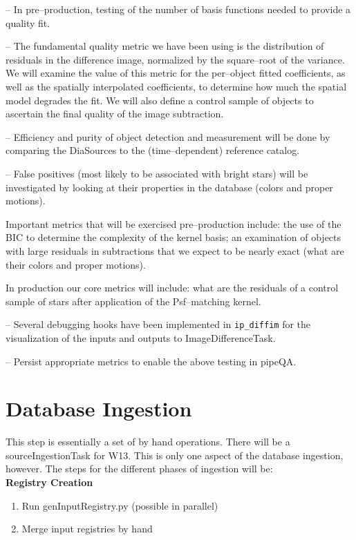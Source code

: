 \documentclass[12pt]{article}
\begin{document}
-- In pre--production, testing of the number of basis functions needed
to provide a quality fit.  

-- The fundamental quality metric we have been using is the
distribution of residuals in the difference image, normalized by the
square--root of the variance.  We will examine the value of this
metric for the per--object fitted coefficients, as well as the
spatially interpolated coefficients, to determine how much the spatial
model degrades the fit.  We will also define a control sample of
objects to ascertain the final quality of the image subtraction.

-- Efficiency and purity of object detection and measurement will be
done by comparing the DiaSources to the (time--dependent) reference
catalog.

-- False positives (most likely to be associated with bright stars)
will be investigated by looking at their properties in the database
(colors and proper motions).

Important metrics that will be exercised pre--production include: the
use of the BIC to determine the complexity of the kernel basis; an
examination of objects with large residuals in subtractions that we
expect to be nearly exact (what are their colors and proper motions).

In production our core metrics will include: what are the residuals of
a control sample of stars after application of the Psf--matching
kernel.

-- Several debugging hooks have been implemented in {\tt ip\_diffim} for
the visualization of the inputs and outputs to ImageDifferenceTask.

-- Persist appropriate metrics to enable the above testing in pipeQA.


\clearpage 
\section{Database Ingestion} 
This step is essentially a set of by hand operations.  
There will be a sourceIngestionTask for W13.  This is only one aspect of the
database ingestion, however.  The steps for the different phases of ingestion will be:\\
{\bf Registry Creation}
\begin{enumerate}
\item Run genInputRegistry.py (possible in parallel)
\item Merge input registries by hand
\end{enumerate}
\end{document}
